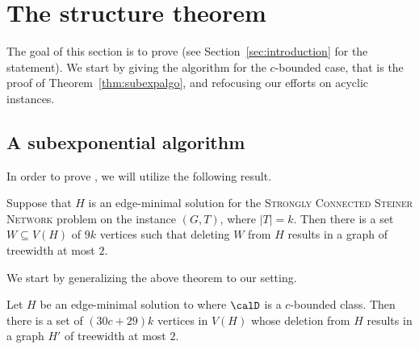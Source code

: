 \section{The structure theorem}

The goal of this section is to prove  (see Section~\ref{sec:introduction} for the statement). We start by giving the algorithm for the $c$-bounded case, that is the proof of Theorem~\ref{thm:subexpalgo}, and refocusing our efforts on acyclic instances.

\subsection{A subexponential algorithm}
\label{sec:dag}

In order to prove , we will utilize the following result.

\begin{theorem}\label{thm:smalldeletion_scss}
Suppose that $H$ is an edge-minimal solution for the \textsc{Strongly Connected Steiner Network} problem on the instance $(G,T)$, where $|T|=k$. Then there is a set $W\subseteq V(H)$ of $9k$ vertices such that deleting $W$ from $H$ results in a graph of treewidth at most $2$.
\end{theorem}

We start by generalizing the above theorem to our setting.

\begin{lemma}\label{lem:smalldeletion}
Let $H$ be an edge-minimal solution to \Dsnfull where $\calD$ is a $c$-bounded class. Then there is a set of $(30c+29)k$ vertices in $V(H)$ whose deletion from $H$ results in a graph $H'$ of treewidth at most $2$.
\end{lemma}

